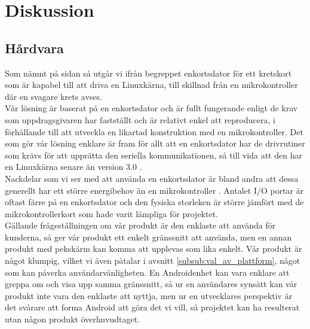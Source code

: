 \documentclass{article}
\begin{document}

    \newpage

    \section{Diskussion} %
    \label{sec:diskussion}
        \subsection{Hårdvara} %
        \label{sub:d_hardvara}
        
            Som nämnt på sidan \pageref{sub:beteckningar} så utgår vi ifrån begreppet enkortsdator för ett kretskort som är kapabel till att driva en Linuxkärna, till skillnad från en mikrokontroller där en svagare krets avses.\\

            \noindent Vår lösning är baserat på en enkortsdator och är fullt fungerande enligt de krav som uppdragsgivaren har fastställt och är relativt enkel att reproducera, i förhållande till att utveckla en likartad konstruktion med en mikrokontroller. Det som gör vår lösning enklare är fram för allt att en enkortsdator har de drivrutiner som krävs för att upprätta den seriella kommunikationen, så till vida att den har en Linuxkärna senare än version 3.0 \cite{silicon}. \\

            \noindent Nackdelar som vi ser med att använda en enkortsdator är bland andra att dessa generellt har ett större energibehov än en mikrokontroller \cite{gadgetBlog, rasp}. Antalet I/O portar är oftast färre på en enkortsdator och den fysiska storleken är större jämfört med de mikrokontrollerkort som hade varit lämpliga för projektet.\\

            \noindent Gällande frågeställningen om vår produkt är den enklaste att använda för kunderna, så ger vår produkt ett enkelt gränssnitt att använda, men en annan produkt med pekskärm kan komma att upplevas som lika enkelt. Vår produkt är något klumpig, vilket vi även påtalar i avsnitt \ref{subsub:val_av_plattform}, något som kan påverka användarvänligheten. En Androidenhet kan vara enklare att greppa om och visa upp samma gränssnitt, så ur en användares synsätt kan vår produkt inte vara den enklaste att nyttja, men ur en utvecklares perspektiv är det svårare att forma Android att göra det vi vill, så projektet kan ha resulterat utan någon produkt överhuvudtaget.
\end{document}
